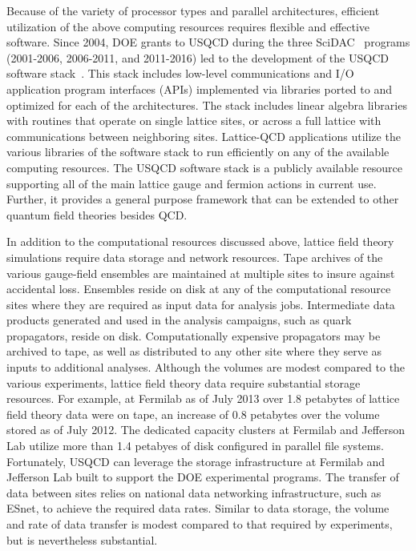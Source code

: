 Because of the variety of processor types and parallel architectures,
efficient utilization of the above computing resources requires flexible and
effective software.  Since 2004, DOE grants to USQCD during the three
SciDAC~\cite{SciDAC} programs (2001-2006, 2006-2011, and 2011-2016) led to the
development of the USQCD software stack~\cite{SciDAC-software}.  This stack
includes low-level communications and I/O application program interfaces
(APIs) implemented via libraries ported to and optimized for each of the
architectures.  The stack includes linear algebra libraries with routines that
operate on single lattice sites, or across a full lattice with communications
between neighboring sites.  Lattice-QCD applications 
utilize the various libraries of the software stack to run efficiently on any
of the available computing resources.  The USQCD software stack is a publicly
available resource supporting all of the main lattice gauge and fermion
actions in current use.  Further, it provides a general purpose framework that
can be extended to other quantum field theories besides QCD.

In addition to the computational resources discussed above, lattice field
theory simulations require data storage and network resources.  Tape archives
of the various gauge-field ensembles are maintained at multiple sites to
insure against accidental loss.  Ensembles reside on disk at any of the
computational resource sites where they are required as input data for
analysis jobs.  Intermediate data products generated and used in the analysis
campaigns, such as quark propagators, reside on disk.  Computationally
expensive propagators may be archived to tape, as well as distributed to any
other site where they serve as inputs to additional analyses.  Although the
volumes are modest compared to the various experiments, lattice field theory
data require substantial storage resources.  For example, at Fermilab as of
July 2013 over 1.8 petabytes of lattice field theory data were on tape, an
increase of 0.8 petabytes over the volume stored as of July 2012.  The
dedicated capacity clusters at Fermilab and Jefferson Lab utilize more than
1.4 petabyes of disk configured in parallel file systems.  Fortunately, USQCD
can leverage the storage infrastructure at Fermilab and Jefferson Lab built to
support the DOE experimental programs.  The transfer of data between sites
relies on national data networking infrastructure, such as ESnet, to achieve
the required data rates.  Similar to data storage, the volume and rate of data
transfer is modest compared to that required by experiments, but is
nevertheless substantial.

